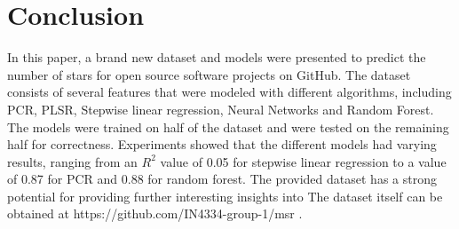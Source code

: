 \section{Conclusion}
	In this paper, a brand new dataset and models were presented to predict the number of stars for open source software projects on GitHub.
	The dataset consists of several features that were modeled with different algorithms, including PCR, PLSR, Stepwise linear regression, Neural Networks and Random Forest.
	The models were trained on half of the dataset and were tested on the remaining half for correctness.
	Experiments showed that the different models had varying results, ranging from an $R^2$ value of 0.05 for stepwise linear regression to a value of 0.87 for PCR and 0.88 for random forest.
	The provided dataset has a strong potential for providing further interesting insights into 
	The dataset itself can be obtained at https://github.com/IN4334-group-1/msr .
